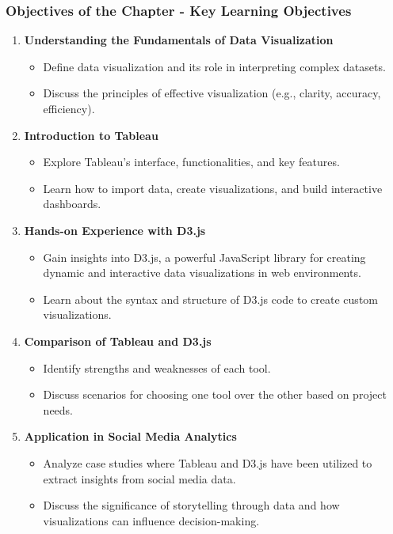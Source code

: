 \documentclass{beamer}
\begin{document}
\begin{frame}[fragile]
    \frametitle{Objectives of the Chapter - Key Learning Objectives}
    \begin{enumerate}
        \item \textbf{Understanding the Fundamentals of Data Visualization}
        \begin{itemize}
            \item Define data visualization and its role in interpreting complex datasets.
            \item Discuss the principles of effective visualization (e.g., clarity, accuracy, efficiency).
        \end{itemize}
        
        \item \textbf{Introduction to Tableau}
        \begin{itemize}
            \item Explore Tableau’s interface, functionalities, and key features.
            \item Learn how to import data, create visualizations, and build interactive dashboards.
        \end{itemize}
        
        \item \textbf{Hands-on Experience with D3.js}
        \begin{itemize}
            \item Gain insights into D3.js, a powerful JavaScript library for creating dynamic and interactive data visualizations in web environments.
            \item Learn about the syntax and structure of D3.js code to create custom visualizations.
        \end{itemize}
        
        \item \textbf{Comparison of Tableau and D3.js}
        \begin{itemize}
            \item Identify strengths and weaknesses of each tool.
            \item Discuss scenarios for choosing one tool over the other based on project needs.
        \end{itemize}
        
        \item \textbf{Application in Social Media Analytics}
        \begin{itemize}
            \item Analyze case studies where Tableau and D3.js have been utilized to extract insights from social media data.
            \item Discuss the significance of storytelling through data and how visualizations can influence decision-making.
        \end{itemize}
    \end{enumerate}
\end{frame}
\end{document}
